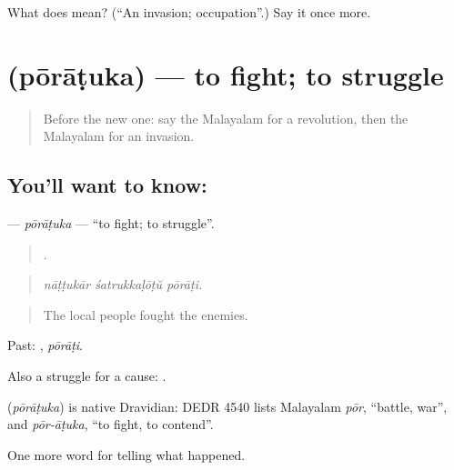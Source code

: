 \begin{tcolorbox}[breakable,colback=teal!4,colframe=teal!35!black,title={Before you move on}]
What does  mean? (\textquotedblleft{}An invasion; occupation\textquotedblright{}.) Say it once more.
\end{tcolorbox}
\section[\texorpdfstring{\ml{പോരാടുക} (pōrāṭuka)}{പോരാടുക (pōrāṭuka)}]{ (pōrāṭuka) — to fight; to struggle}

\label{lesson:ML-C401-poratuka}



\begin{quote}
Before the new one: say the Malayalam for a revolution, then the Malayalam for an invasion.
\end{quote}

\subsection*{You'll want to know: }
\textbf{} — \emph{pōrāṭuka} — \textquotedblleft{}to fight; to struggle\textquotedblright{}.

\begin{quote}
  .
\end{quote}

\begin{quote}
\emph{nāṭṭukār śatrukkaḷōṭŭ pōrāṭi.}
\end{quote}

\begin{quote}
The local people fought the enemies.
\end{quote}

Past: , \emph{pōrāṭi}.

Also a struggle for a cause:  .

\begin{cousinweb}
\textbf{} (\emph{pōrāṭuka}) is native Dravidian: DEDR 4540 lists Malayalam \emph{pōr}, \textquotedblleft{}battle, war\textquotedblright{}, and \emph{pōr-āṭuka}, \textquotedblleft{}to fight, to contend\textquotedblright{}.
\end{cousinweb}

\begin{grammarlens}[title={What you've built}]
One more word for telling what happened.
\end{grammarlens}

